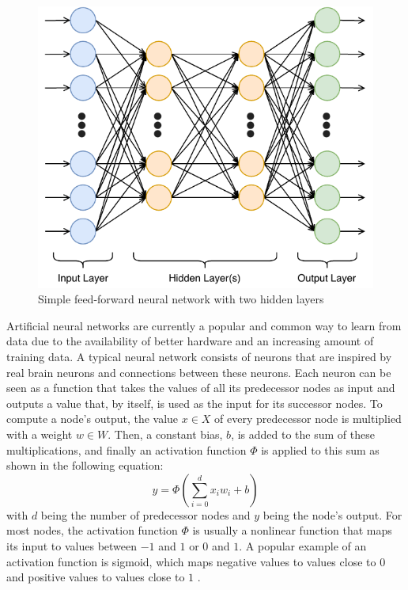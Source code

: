 \begin{figure}[h]
\centering
\includegraphics[width=0.45\paperwidth]{figures/neural-network}
\caption{Simple feed-forward neural network with two hidden layers}
\label{fig:neural-network}
\end{figure}

Artificial neural networks are currently a popular and common way to learn from data due to the availability of better hardware and an increasing amount of training data.
A typical neural network consists of neurons that are inspired by real brain neurons and connections between these neurons.
Each neuron can be seen as a function that takes the values of all its predecessor nodes as input and outputs a value that, by itself, is used as the input for its successor nodes.
To compute a node's output, the value $x \in X$ of every predecessor node is multiplied with a weight $w \in W$.
Then, a constant bias, $b$, is added to the sum of these multiplications, and finally an activation function $\Phi$ is applied to this sum as shown in the following equation:
\[
	y = \Phi(\sum_{i=0}^{d}x_iw_i + b)
\]
with $d$ being the number of predecessor nodes and $y$ being the node's output.
For most nodes, the activation function $\Phi$ is usually a nonlinear function that maps its input to values between $-1$ and $1$ or $0$ and $1$.
A popular example of an activation function is sigmoid, which maps negative values to values close to $0$ and positive values to values close to $1$ \cite[p.~4--13]{Aggarwal2018}.

